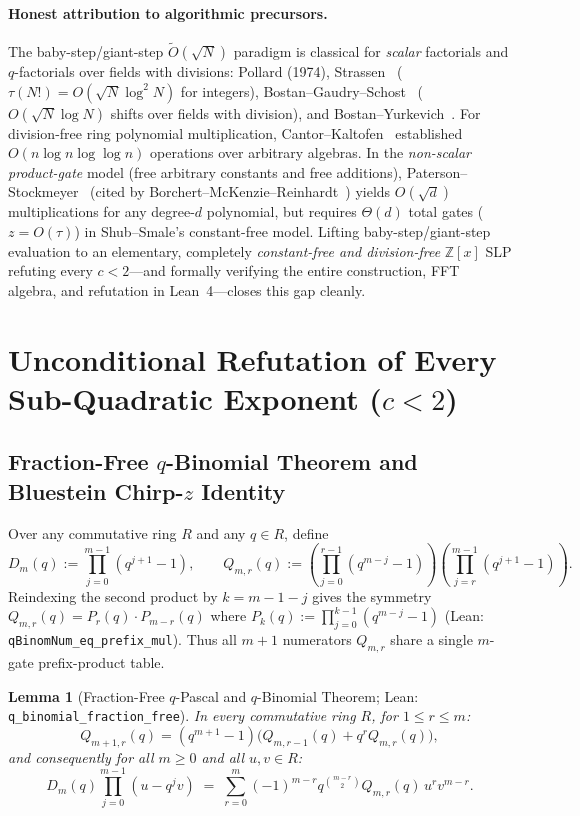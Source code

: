 \documentclass[11pt]{article}
\newtheorem{lemma}[theorem]{Lemma}
\newcommand{\Z}{\mathbb{Z}}
\newcommand{\code}[1]{\texttt{#1}}
\begin{document}
\paragraph{Honest attribution to algorithmic precursors.}
The baby-step/giant-step $\tilde{O}(\sqrt{N})$ paradigm is classical for \emph{scalar} factorials and $q$-factorials over fields with divisions: Pollard (1974), Strassen~\cite{Strassen1976} ($\tau(N!) = O(\sqrt{N} \log^2 N)$ for integers), Bostan--Gaudry--Schost~\cite{BGS2007} ($O(\sqrt{N} \log N)$ shifts over fields with division), and Bostan--Yurkevich~\cite{BostanYurkevich2022}. For division-free ring polynomial multiplication, Cantor--Kaltofen~\cite{CantorKaltofen1991} established $O(n \log n \log\log n)$ operations over arbitrary algebras. In the \emph{non-scalar product-gate} model (free arbitrary constants and free additions), Paterson--Stockmeyer~\cite{PatersonStockmeyer1973} (cited by Borchert--McKenzie--Reinhardt~\cite{BMR2013}) yields $O(\sqrt{d})$ multiplications for any degree-$d$ polynomial, but requires $\Theta(d)$ total gates ($z = O(\tau)$) in Shub--Smale's constant-free model. Lifting baby-step/giant-step evaluation to an elementary, completely \emph{constant-free and division-free} $\Z[x]$ SLP refuting every $c < 2$---and formally verifying the entire construction, FFT algebra, and refutation in Lean~4---closes this gap cleanly.

\section{Unconditional Refutation of Every Sub-Quadratic Exponent ($c < 2$)}\label{sec:subquad}

\subsection{Fraction-Free $q$-Binomial Theorem and Bluestein Chirp-$z$ Identity}
Over any commutative ring $R$ and any $q \in R$, define
\[
  D_m(q) := \prod_{j=0}^{m-1} (q^{j+1} - 1), \qquad
  Q_{m,r}(q) := \left(\prod_{j=0}^{r-1} (q^{m-j} - 1)\right)\left(\prod_{j=r}^{m-1} (q^{j+1} - 1)\right).
\]
Reindexing the second product by $k = m - 1 - j$ gives the symmetry $Q_{m,r}(q) = P_r(q) \cdot P_{m-r}(q)$ where $P_k(q) := \prod_{j=0}^{k-1} (q^{m-j} - 1)$ (Lean: \code{qBinomNum\_eq\_prefix\_mul}). Thus all $m + 1$ numerators $Q_{m,r}$ share a single $m$-gate prefix-product table.

\begin{lemma}[Fraction-Free $q$-Pascal and $q$-Binomial Theorem; Lean: \code{q\_binomial\_fraction\_free}]\label{lem:qbinom}
In every commutative ring $R$, for $1 \le r \le m$:
\[
  Q_{m+1,r}(q) = (q^{m+1} - 1)\bigl(Q_{m,r-1}(q) + q^r Q_{m,r}(q)\bigr),
\]
and consequently for all $m \ge 0$ and all $u, v \in R$:
\[
  D_m(q) \prod_{j=0}^{m-1} (u - q^j v) \;=\; \sum_{r=0}^m (-1)^{m-r} q^{\binom{m-r}{2}} Q_{m,r}(q)\, u^r v^{m-r}.
\]
\end{lemma}
\end{document}

